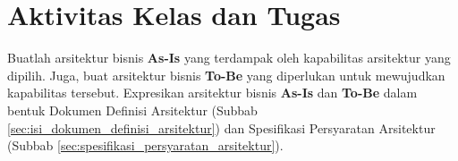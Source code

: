 \section{Aktivitas Kelas dan Tugas}

Buatlah arsitektur bisnis \textbf{As-Is} yang terdampak oleh kapabilitas arsitektur yang dipilih. Juga, buat arsitektur bisnis \textbf{To-Be} yang diperlukan untuk mewujudkan kapabilitas tersebut. 
Expresikan arsitektur bisnis \textbf{As-Is} dan \textbf{To-Be} dalam bentuk Dokumen Definisi Arsitektur (Subbab \ref{sec:isi_dokumen_definisi_arsitektur}) dan Spesifikasi Persyaratan Arsitektur (Subbab \ref{sec:spesifikasi_persyaratan_arsitektur}).